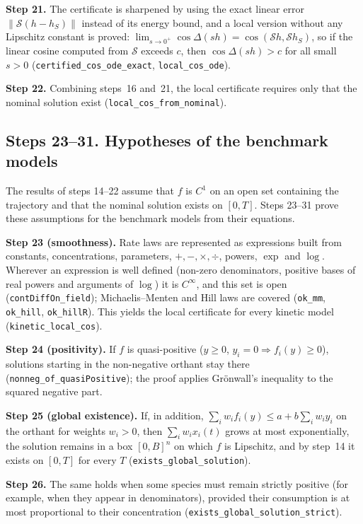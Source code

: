\textbf{Step 21.} The certificate is sharpened by using the exact linear error $\|\mathcal S(h-h_S)\|$ instead of its energy bound, and a local version without any Lipschitz constant is proved: $\lim_{s\to0^+}\cos\Delta(sh)=\cos(\mathcal Sh,\mathcal Sh_S)$, so if the linear cosine computed from $\mathcal S$ exceeds $c$, then $\cos\Delta(sh)>c$ for all small $s>0$ (\texttt{certified\_cos\_ode\_exact}, \texttt{local\_cos\_ode}).

\textbf{Step 22.} Combining steps~16 and~21, the local certificate requires only that the nominal solution exist (\texttt{local\_cos\_from\_nominal}).

\subsection*{Steps 23--31. Hypotheses of the benchmark models}

The results of steps 14--22 assume that $f$ is $C^1$ on an open set containing the trajectory and that the nominal solution exists on $[0,T]$. Steps 23--31 prove these assumptions for the benchmark models from their equations.

\textbf{Step 23 (smoothness).} Rate laws are represented as expressions built from constants, concentrations, parameters, $+,-,\times,\div$, powers, $\exp$ and $\log$. Wherever an expression is well defined (non-zero denominators, positive bases of real powers and arguments of $\log$) it is $C^\infty$, and this set is open (\texttt{contDiffOn\_field}); Michaelis--Menten and Hill laws are covered (\texttt{ok\_mm}, \texttt{ok\_hill}, \texttt{ok\_hillR}). This yields the local certificate for every kinetic model (\texttt{kinetic\_local\_cos}).

\textbf{Step 24 (positivity).} If $f$ is quasi-positive ($y\ge0$, $y_i=0\Rightarrow f_i(y)\ge0$), solutions starting in the non-negative orthant stay there (\texttt{nonneg\_of\_quasiPositive}); the proof applies Grönwall's inequality to the squared negative part.

\textbf{Step 25 (global existence).} If, in addition, $\sum_iw_if_i(y)\le a+b\sum_iw_iy_i$ on the orthant for weights $w_i>0$, then $\sum_iw_ix_i(t)$ grows at most exponentially, the solution remains in a box $[0,B]^n$ on which $f$ is Lipschitz, and by step~14 it exists on $[0,T]$ for every $T$ (\texttt{exists\_global\_solution}).

\textbf{Step 26.} The same holds when some species must remain strictly positive (for example, when they appear in denominators), provided their consumption is at most proportional to their concentration (\texttt{exists\_global\_solution\_strict}).

